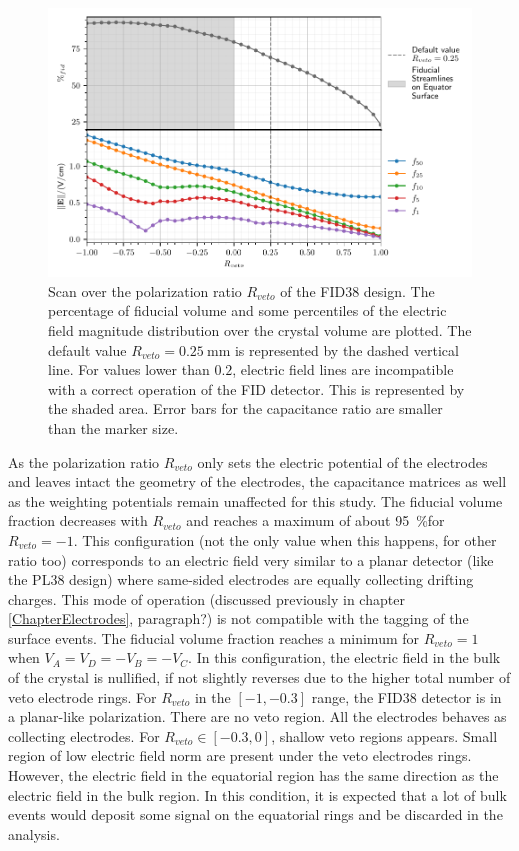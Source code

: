 \begin{figure}
\centering
\includegraphics[scale=1]{Figures/ElectrodesScan/capacitance_fiducial_veto_ratio.pdf}
\caption{Scan over the polarization ratio $R_{veto}$ of the FID38 design. The percentage of fiducial volume and some percentiles of the electric field magnitude distribution over the crystal volume are plotted. The default value $R_{veto}=\SI{0.25}{\mm}$ is represented by the dashed vertical line. For values lower than $0.2$, electric field lines are incompatible with a correct operation of the FID detector. This is represented by the shaded area. Error bars for the capacitance ratio are smaller than the marker size.}
\label{fig:capacitance-fiducial-veto-ratio}
\end{figure}

As the polarization ratio $R_{veto}$ only sets the electric potential of the electrodes and leaves intact the geometry of the electrodes, the capacitance matrices as well as the weighting potentials remain unaffected for this study.
The fiducial volume fraction decreases with $R_{veto}$ and reaches a maximum of about \SI{95}{\percent}for $R_{veto}=-1$. This configuration (not the only value when this happens, for other ratio too) corresponds to an electric field very similar to a planar detector (like the PL38 design) where same-sided electrodes are equally collecting drifting charges. This mode of operation (discussed previously in chapter \ref{ChapterElectrodes}, paragraph?) is not compatible with the tagging of the surface events.
The fiducial volume fraction reaches a minimum for $R_{veto}=1$ when $V_A = V_D = -V_B = -V_C$. In this configuration, the electric field in the bulk of the crystal is nullified, if not slightly reverses due to the higher total number of veto electrode rings.
For $R_{veto}$ in the $[-1, -0.3]$ range, the FID38 detector is in a planar-like polarization. There are no veto region. All the electrodes behaves as collecting electrodes.
For $R_{veto} \in [-0.3, 0]$, shallow veto regions appears. Small region of low electric field norm are present under the veto electrodes rings. However, the electric field in the equatorial region has the same direction as the electric field in the bulk region. In this condition, it is expected that a lot of bulk events would deposit some signal on the equatorial rings and be discarded in the analysis.

